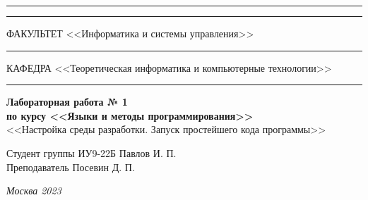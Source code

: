 \documentclass[a4paper, 14pt]{extarticle}
\begin{document}
\begin{titlepage}
\vspace{-25pt}
\hspace{-35pt}\rule{\textwidth}{2.3pt}

\vspace*{-20.3pt}
\hspace{-35pt}\rule{\textwidth}{0.4pt}

\vspace{1.5ex}
\hspace{-35pt} \noindent \small ФАКУЛЬТЕТ\hspace{80pt} <<Информатика и системы управления>>

\vspace*{-16pt}
\hspace{47pt}\rule{0.83\textwidth}{0.4pt}

\vspace{0.5ex}
\hspace{-35pt} \noindent \small КАФЕДРА\hspace{50pt} <<Теоретическая информатика и компьютерные технологии>>

\vspace*{-16pt}
\hspace{30pt}\rule{0.866\textwidth}{0.4pt}
  
\vspace{11em}

\begin{center}
\Large {\bf Лабораторная работа № 1} \\ 
\large {\bf по курсу <<Языки и методы программирования>>} \\
\large <<Настройка среды разработки. Запуск простейшего кода программы>> 
\end{center}\normalsize

\vspace{8em}


\begin{flushright}
  {Студент группы ИУ9-22Б Павлов И. П. \hspace*{15pt}\\ 
  \vspace{2ex}
  Преподаватель Посевин Д. П.\hspace*{15pt}}
\end{flushright}

\bigskip

\vfill
 

\begin{center}
\textsl{Москва 2023}
\end{center}
\end{titlepage}
\end{document}
